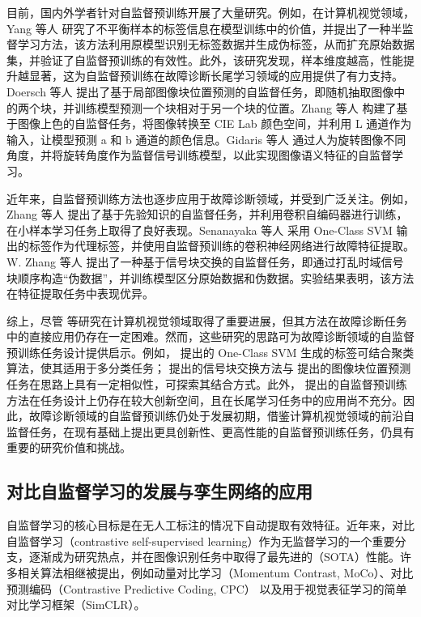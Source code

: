 \documentclass[master]{thesis-uestc}
\begin{document}
目前，国内外学者针对自监督预训练开展了大量研究。例如，在计算机视觉领域，Yang 等人 研究了不平衡样本的标签信息在模型训练中的价值，并提出了一种半监督学习方法，该方法利用原模型识别无标签数据并生成伪标签，从而扩充原始数据集，并验证了自监督预训练的有效性。此外，该研究发现，样本维度越高，性能提升越显著，这为自监督预训练在故障诊断长尾学习领域的应用提供了有力支持。Doersch 等人 提出了基于局部图像块位置预测的自监督任务，即随机抽取图像中的两个块，并训练模型预测一个块相对于另一个块的位置。Zhang 等人 构建了基于图像上色的自监督任务，将图像转换至 CIE Lab 颜色空间，并利用 L 通道作为输入，让模型预测 a 和 b 通道的颜色信息。Gidaris 等人 通过人为旋转图像不同角度，并将旋转角度作为监督信号训练模型，以此实现图像语义特征的自监督学习。

近年来，自监督预训练方法也逐步应用于故障诊断领域，并受到广泛关注。例如，Zhang 等人 提出了基于先验知识的自监督任务，并利用卷积自编码器进行训练，在小样本学习任务上取得了良好表现。Senanayaka 等人 采用 One-Class SVM 输出的标签作为代理标签，并使用自监督预训练的卷积神经网络进行故障特征提取。W. Zhang 等人 提出了一种基于信号块交换的自监督任务，即通过打乱时域信号块顺序构造“伪数据”，并训练模型区分原始数据和伪数据。实验结果表明，该方法在特征提取任务中表现优异。

综上，尽管 等研究在计算机视觉领域取得了重要进展，但其方法在故障诊断任务中的直接应用仍存在一定困难。然而，这些研究的思路可为故障诊断领域的自监督预训练任务设计提供启示。例如， 提出的 One-Class SVM 生成的标签可结合聚类算法，使其适用于多分类任务； 提出的信号块交换方法与 提出的图像块位置预测任务在思路上具有一定相似性，可探索其结合方式。此外， 提出的自监督预训练方法在任务设计上仍存在较大创新空间，且在长尾学习任务中的应用尚不充分。因此，故障诊断领域的自监督预训练仍处于发展初期，借鉴计算机视觉领域的前沿自监督任务，在现有基础上提出更具创新性、更高性能的自监督预训练任务，仍具有重要的研究价值和挑战。

\subsection{对比自监督学习的发展与孪生网络的应用}

自监督学习的核心目标是在无人工标注的情况下自动提取有效特征。近年来，对比自监督学习（contrastive self-supervised learning）作为无监督学习的一个重要分支，逐渐成为研究热点，并在图像识别任务中取得了最先进的（SOTA）性能。许多相关算法相继被提出，例如动量对比学习（Momentum Contrast, MoCo）、对比预测编码（Contrastive Predictive Coding, CPC） 以及用于视觉表征学习的简单对比学习框架（SimCLR）。
\end{document}
